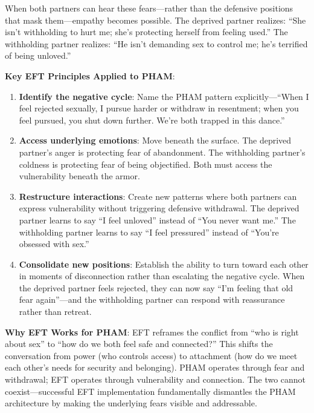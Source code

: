 \documentclass[12pt,openany]{book}
\numberwithin{equation}{chapter}
\begin{document}
When both partners can hear these fears---rather than the defensive positions that mask them---empathy becomes possible. The deprived partner realizes: ``She isn't withholding to hurt me; she's protecting herself from feeling used.'' The withholding partner realizes: ``He isn't demanding sex to control me; he's terrified of being unloved.''

\textbf{Key EFT Principles Applied to PHAM}:
\begin{enumerate}
    \item \textbf{Identify the negative cycle}: Name the PHAM pattern explicitly---``When I feel rejected sexually, I pursue harder or withdraw in resentment; when you feel pursued, you shut down further. We're both trapped in this dance.''
    
    \item \textbf{Access underlying emotions}: Move beneath the surface. The deprived partner's anger is protecting fear of abandonment. The withholding partner's coldness is protecting fear of being objectified. Both must access the vulnerability beneath the armor.
    
    \item \textbf{Restructure interactions}: Create new patterns where both partners can express vulnerability without triggering defensive withdrawal. The deprived partner learns to say ``I feel unloved'' instead of ``You never want me.'' The withholding partner learns to say ``I feel pressured'' instead of ``You're obsessed with sex.''
    
    \item \textbf{Consolidate new positions}: Establish the ability to turn toward each other in moments of disconnection rather than escalating the negative cycle. When the deprived partner feels rejected, they can now say ``I'm feeling that old fear again''---and the withholding partner can respond with reassurance rather than retreat.
\end{enumerate}

\textbf{Why EFT Works for PHAM}: EFT reframes the conflict from ``who is right about sex'' to ``how do we both feel safe and connected?'' This shifts the conversation from power (who controls access) to attachment (how do we meet each other's needs for security and belonging). PHAM operates through fear and withdrawal; EFT operates through vulnerability and connection. The two cannot coexist---successful EFT implementation fundamentally dismantles the PHAM architecture by making the underlying fears visible and addressable.
\end{document}
